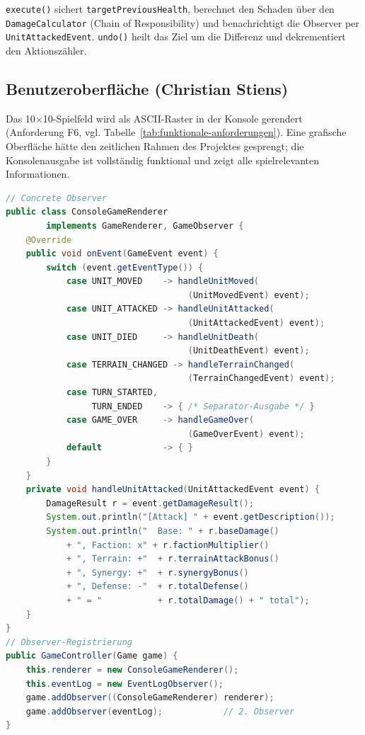 \texttt{execute()} sichert \texttt{targetPreviousHealth}, berechnet den Schaden über den \texttt{DamageCalculator} (Chain of Responsibility) und benachrichtigt die Observer per \texttt{UnitAttackedEvent}.
\texttt{undo()} heilt das Ziel um die Differenz und dekrementiert den Aktionszähler.

\subsection{Benutzeroberfläche (Christian Stiens)}
\label{sec:ui}

Das 10$\times$10-Spielfeld wird als ASCII-Raster in der Konsole gerendert (Anforderung F6, vgl. Tabelle~\ref{tab:funktionale-anforderungen}).
Eine grafische Oberfläche hätte den zeitlichen Rahmen des Projektes gesprengt; die Konsolenausgabe ist vollständig funktional und zeigt alle spielrelevanten Informationen.

\begin{lstlisting}[language=Java, caption={Observer Pattern -- ConsoleGameRenderer.onEvent() und GameController}, label={lst:observer-ui}]
// Concrete Observer
public class ConsoleGameRenderer
        implements GameRenderer, GameObserver {
    @Override
    public void onEvent(GameEvent event) {
        switch (event.getEventType()) {
            case UNIT_MOVED    -> handleUnitMoved(
                                    (UnitMovedEvent) event);
            case UNIT_ATTACKED -> handleUnitAttacked(
                                    (UnitAttackedEvent) event);
            case UNIT_DIED     -> handleUnitDeath(
                                    (UnitDeathEvent) event);
            case TERRAIN_CHANGED -> handleTerrainChanged(
                                    (TerrainChangedEvent) event);
            case TURN_STARTED,
                 TURN_ENDED    -> { /* Separator-Ausgabe */ }
            case GAME_OVER     -> handleGameOver(
                                    (GameOverEvent) event);
            default            -> { }
        }
    }
    private void handleUnitAttacked(UnitAttackedEvent event) {
        DamageResult r = event.getDamageResult();
        System.out.println("[Attack] " + event.getDescription());
        System.out.println("  Base: " + r.baseDamage()
            + ", Faction: x" + r.factionMultiplier()
            + ", Terrain: +"  + r.terrainAttackBonus()
            + ", Synergy: +"  + r.synergyBonus()
            + ", Defense: -"  + r.totalDefense()
            + " = "           + r.totalDamage() + " total");
    }
}
// Observer-Registrierung
public GameController(Game game) {
    this.renderer = new ConsoleGameRenderer();
    this.eventLog = new EventLogObserver();
    game.addObserver((ConsoleGameRenderer) renderer);
    game.addObserver(eventLog);            // 2. Observer
}
\end{lstlisting}

